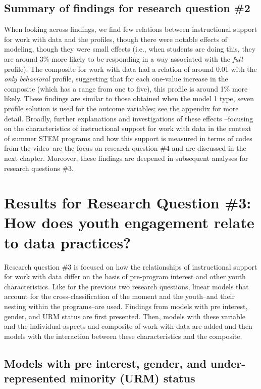 \documentclass[]{book}
\theoremstyle{definition}
\theoremstyle{definition}
\theoremstyle{definition}
\theoremstyle{remark}
\begin{document}
\subsection{Summary of findings for research question
\#2}\label{summary-of-findings-for-research-question-2}

When looking across findings, we find few relations between
instructional support for work with data and the profiles, though there
were notable effects of modeling, though they were small effects (i.e.,
when students are doing this, they are around 3\% more likely to be
responding in a way associated with the \emph{full} profile). The
composite for work with data had a relation of around 0.01 with the
\emph{only behavioral} profile, suggesting that for each one-value
increase in the composite (which has a range from one to five), this
profile is around 1\% more likely. These findings are similar to those
obtained when the model 1 type, seven profile solution is used for the
outcome variables; see the appendix for more detail. Broadly, further
explanations and investigations of these effects --focusing on the
characteristics of instructional support for work with data in the
context of summer STEM programs and how this support is measured in
terms of codes from the video--are the focus on research question \#4
and are discussed in the next chapter. Moreover, these findings are
deepened in subsequent analyses for research questions \#3.

\section{Results for Research Question \#3: How does youth engagement
relate to data
practices?}\label{results-for-research-question-3-how-does-youth-engagement-relate-to-data-practices}

Research question \#3 is focused on how the relationships of
instructional support for work with data differ on the basis of
pre-program interest and other youth characteristics. Like for the
previous two research questions, linear models that account for the
cross-classification of the moment and the youth--and their nesting
within the programs--are used. Findings from models with pre interest,
gender, and URM status are first presented. Then, models with these
variable and the individual aspects and composite of work with data are
added and then models with the interaction between these characteristics
and the composite.

\subsection{Models with pre interest, gender, and under-represented
minority (URM)
status}\label{models-with-pre-interest-gender-and-under-represented-minority-urm-status}
\end{document}
